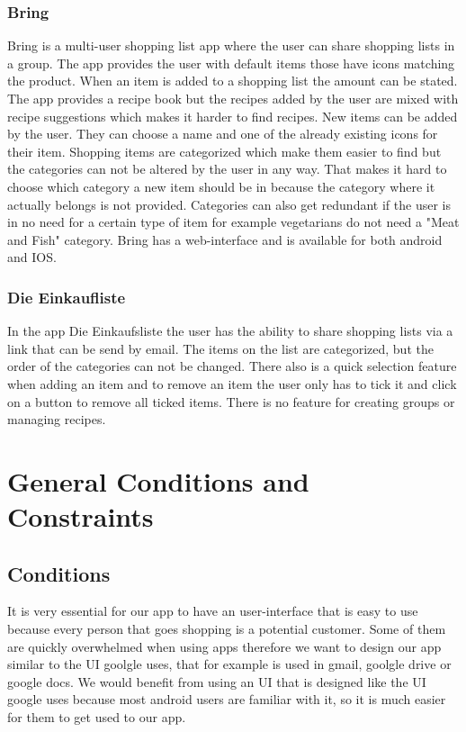 \documentclass[12pt]{article}
\theoremstyle{definition}
\begin{document}
\subsubsection{Bring}
Bring is a multi-user shopping list app where the user can share shopping lists in a group. The app provides the user with default items those have icons matching the product. When an item is added to a shopping list the amount can be stated. The app provides a recipe book but the recipes added by the user are mixed with recipe suggestions which makes it harder to find recipes. New items can be added by the user. They can choose a name and one of the already existing icons for their item. Shopping items are categorized which make them easier to find but the categories can not be altered by the user in any way. That makes it hard to choose which category a new item should be in because the category where it actually belongs is not provided. Categories can also get redundant if the user is in no need for a certain type of item for example vegetarians do not need a "Meat and Fish" category. Bring has a web-interface   and is available for both android and IOS.  

\subsubsection{Die Einkaufliste}
In the app Die Einkaufsliste the user has the ability to share shopping lists via a link that can be send by email. The items on the list are categorized, but the order of the categories can not be changed. There also is a quick selection feature when adding an item and to remove an item the user only has to tick it and click on a button to remove all ticked items. There is no feature for creating groups or managing recipes.

\pagebreak

\section{General Conditions and Constraints}

\subsection{Conditions}
It is very essential for our app to have an user-interface that is easy to use because every person that goes shopping is a potential customer. Some of them are quickly overwhelmed when using apps therefore we want to design our app similar to the UI goolgle uses, that for example  is used in  gmail, goolgle drive or google docs. We would benefit from using an UI that is designed like the UI google uses because most android users are familiar with it, so it is much easier for them to get used to our app.
\end{document}
